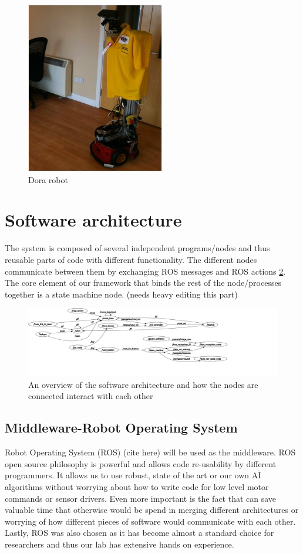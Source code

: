 \documentclass[conference]{IEEEtran}
\begin{document}
\begin{figure}[!t]
\centering
\includegraphics[width=3.in]{dorafinal.jpg}
\caption{Dora robot}
\label{fig:dora}
\end{figure}

\section{Software architecture}
The system is composed of several independent programs/nodes and thus reusable parts of code with different functionality. The different nodes communicate between them by exchanging ROS messages and ROS actions \ref{fig:nodes}. The core element of our framework that binds the rest of the node/processes together is a state machine node. (needs heavy editing this part)

\begin{figure}[!t]
\centering
\includegraphics[width=4.in]{nodes.png}
\caption{An overview of the software architecture and how the nodes are connected interact with each other}
\label{fig:nodes}
\end{figure}

\subsection{Middleware-Robot Operating System}
Robot Operating System (ROS) (cite here) will be used as the middleware. ROS open source philosophy is powerful and allows code re-usability by different programmers. It allows us to use robust, state of the art or our own AI algorithms without worrying about how to write code for low level motor commands or sensor drivers. Even more important is the fact that can save valuable time that otherwise would be spend in merging different architectures or worrying of how different pieces of software would communicate with each other. Lastly, ROS was also chosen as it has become almost a standard choice for researchers and thus our lab has extensive hands on experience.
\end{document}
